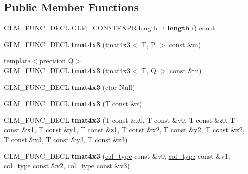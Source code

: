 \subsection*{Public Member Functions}
\begin{DoxyCompactItemize}
\item 
G\+L\+M\+\_\+\+F\+U\+N\+C\+\_\+\+D\+E\+CL G\+L\+M\+\_\+\+C\+O\+N\+S\+T\+E\+X\+PR length\+\_\+t {\bfseries length} () const \hypertarget{structglm_1_1detail_1_1tmat4x3_ad35352f950b0e695e2806740e29ca57d}{}\label{structglm_1_1detail_1_1tmat4x3_ad35352f950b0e695e2806740e29ca57d}

\item 
G\+L\+M\+\_\+\+F\+U\+N\+C\+\_\+\+D\+E\+CL {\bfseries tmat4x3} (\hyperlink{structglm_1_1detail_1_1tmat4x3}{tmat4x3}$<$ T, P $>$ const \&m)\hypertarget{structglm_1_1detail_1_1tmat4x3_ae77cc858418c288537a65d74d891bf00}{}\label{structglm_1_1detail_1_1tmat4x3_ae77cc858418c288537a65d74d891bf00}

\item 
{\footnotesize template$<$precision Q$>$ }\\G\+L\+M\+\_\+\+F\+U\+N\+C\+\_\+\+D\+E\+CL {\bfseries tmat4x3} (\hyperlink{structglm_1_1detail_1_1tmat4x3}{tmat4x3}$<$ T, Q $>$ const \&m)\hypertarget{structglm_1_1detail_1_1tmat4x3_a5fcf4eb115cbf03560ab19f4673f9b3c}{}\label{structglm_1_1detail_1_1tmat4x3_a5fcf4eb115cbf03560ab19f4673f9b3c}

\item 
G\+L\+M\+\_\+\+F\+U\+N\+C\+\_\+\+D\+E\+CL {\bfseries tmat4x3} (ctor Null)\hypertarget{structglm_1_1detail_1_1tmat4x3_abcb7184aeb3a229850057e6bbdb81030}{}\label{structglm_1_1detail_1_1tmat4x3_abcb7184aeb3a229850057e6bbdb81030}

\item 
G\+L\+M\+\_\+\+F\+U\+N\+C\+\_\+\+D\+E\+CL {\bfseries tmat4x3} (T const \&x)\hypertarget{structglm_1_1detail_1_1tmat4x3_a2d1e973fa0706ef8e0fffa4ee23712ab}{}\label{structglm_1_1detail_1_1tmat4x3_a2d1e973fa0706ef8e0fffa4ee23712ab}

\item 
G\+L\+M\+\_\+\+F\+U\+N\+C\+\_\+\+D\+E\+CL {\bfseries tmat4x3} (T const \&x0, T const \&y0, T const \&z0, T const \&x1, T const \&y1, T const \&z1, T const \&x2, T const \&y2, T const \&z2, T const \&x3, T const \&y3, T const \&z3)\hypertarget{structglm_1_1detail_1_1tmat4x3_ae83188b56015ab7922dd9827a8795f65}{}\label{structglm_1_1detail_1_1tmat4x3_ae83188b56015ab7922dd9827a8795f65}

\item 
G\+L\+M\+\_\+\+F\+U\+N\+C\+\_\+\+D\+E\+CL {\bfseries tmat4x3} (\hyperlink{structglm_1_1detail_1_1tvec3}{col\+\_\+type} const \&v0, \hyperlink{structglm_1_1detail_1_1tvec3}{col\+\_\+type} const \&v1, \hyperlink{structglm_1_1detail_1_1tvec3}{col\+\_\+type} const \&v2, \hyperlink{structglm_1_1detail_1_1tvec3}{col\+\_\+type} const \&v3)\hypertarget{structglm_1_1detail_1_1tmat4x3_a5783ce8745f4ea713c2c1cde65154aaf}{}\label{structglm_1_1detail_1_1tmat4x3_a5783ce8745f4ea713c2c1cde65154aaf}


\end{DoxyCompactItemize}
